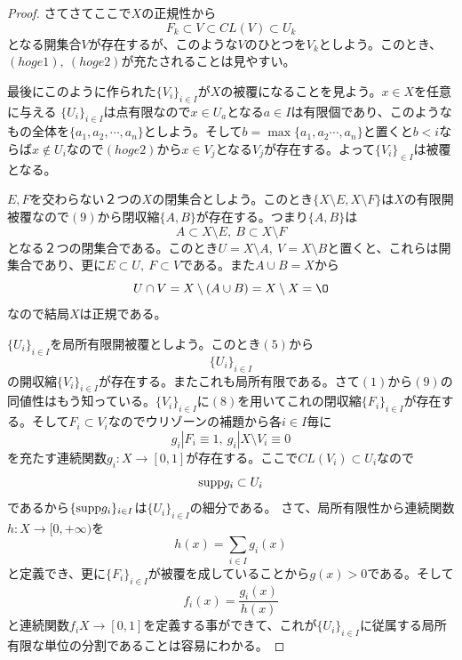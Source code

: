 \documentclass[leqno]{jsarticle}
\newcommand{\To}{\Longrightarrow}
\newcommand{\mgn}{\infty}
\newcommand{\supp}{\text{{\rm supp}}}
\begin{document}
\begin{proof}
さてさてここで$X$の正規性から
\[
F_k\subset V\subset CL(V)\subset U_k
\]
となる開集合$V$が存在するが、このような$V$のひとつを$V_k$としよう。このとき、$(hoge1),\ (hoge2)$が充たされることは見やすい。\par
最後にこのように作られた$\{V_i\}_{i\in I}$が$X$の被覆になることを見よう。$x\in X$を任意に与える
$\{U_i\}_{i\in I}$は点有限なので$x\in U_{a}$となる$a\in I$は有限個であり、このようなもの全体を$\{a_1,a_2,\cdots,a_n\}$としよう。そして$b=\max\{a_1,a_2\cdots ,a_n\}$と置くと$b<i$ならば$x\not\in U_i$なので$(hoge2)$から$x\in V_{j}$となる$V_j$が存在する。よって$\{V_i\}_{\in I}$は被覆となる。
\par [$(1)\To(4)$の証明終わり]\par
[$(9)\To(1)$の証明]\par
$E,F$を交わらない２つの$X$の閉集合としよう。このとき$\{X\setminus E,X\setminus F\}$は$X$の有限開被覆なので$(9)$から閉収縮$\{A,B\}$が存在する。つまり$\{A,B\}$は
\[
A\subset X\setminus E,\ B\subset X\setminus F
\]
となる２つの閉集合である。このとき$U=X\setminus A,\ V=X\setminus B$と置くと、これらは開集合であり、更に$E\subset U,\ F\subset V$である。また$A\cup B=X$から
\[
U\cap V=X\setminus (A\cup B)=X\setminus X=\O
\]
なので結局$X$は正規である。
\par [$(9)\To(1)$の証明終わり]\par
[$(5)\To(10)$の証明]\par
$\{U_i\}_{i\in I}$を局所有限開被覆としよう。このとき$(5)$から$$\{U_i\}_{i\in I}$$の開収縮$\{V_i\}_{i\in I}$が存在する。またこれも局所有限である。さて$(1)$から$(9)$の同値性はもう知っている。$\{V_i\}_{i\in I}$に$(8)$を用いてこれの閉収縮$\{F_i\}_{i\in I}$が存在する。そして$F_i\subset V_i$なのでウリゾーンの補題から各$i\in I$毎に
\[
g_{i}|F_i\equiv 1,\ g_i|X\setminus V_i\equiv 0
\]
を充たす連続関数$g_i:X\to [0,1]$が存在する。ここで$CL(V_i)\subset U_i$なので
\[
\supp g_i\subset U_i
\]
であるから$\{\supp g_i\}_{i\in I}$は$\{U_i\}_{i\in I}$の細分である。
さて、局所有限性から連続関数$h:X\to[0,+\mgn)$を
\[
h(x)=\sum_{i\in I}g_i(x)
\]
と定義でき、更に$\{F_i\}_{i\in I}$が被覆を成していることから$g(x)>0$である。そして
\[
f_i(x)=\frac{g_i(x)}{h(x)}
\]
と連続関数$f_iX\to [0,1]$を定義する事ができて、これが$\{U_i\}_{i\in I}$に従属する局所有限な単位の分割であることは容易にわかる。


\end{proof}
\end{document}
